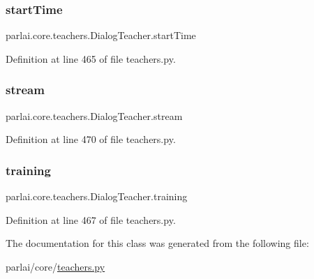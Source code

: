 \subsubsection{\texorpdfstring{start\+Time}{startTime}}
{\footnotesize\ttfamily parlai.\+core.\+teachers.\+Dialog\+Teacher.\+start\+Time}



Definition at line 465 of file teachers.\+py.

\mbox{\label{classparlai_1_1core_1_1teachers_1_1DialogTeacher_a82fa5b519a14c4301ce82f6c59c8867a}} 
\subsubsection{\texorpdfstring{stream}{stream}}
{\footnotesize\ttfamily parlai.\+core.\+teachers.\+Dialog\+Teacher.\+stream}



Definition at line 470 of file teachers.\+py.

\mbox{\label{classparlai_1_1core_1_1teachers_1_1DialogTeacher_aaca26d863c30e54b4612539843f20b49}} 
\subsubsection{\texorpdfstring{training}{training}}
{\footnotesize\ttfamily parlai.\+core.\+teachers.\+Dialog\+Teacher.\+training}



Definition at line 467 of file teachers.\+py.



The documentation for this class was generated from the following file\+:\begin{DoxyCompactItemize}
\item 
parlai/core/\hyperlink{teachers_8py}{teachers.\+py}\end{DoxyCompactItemize}
